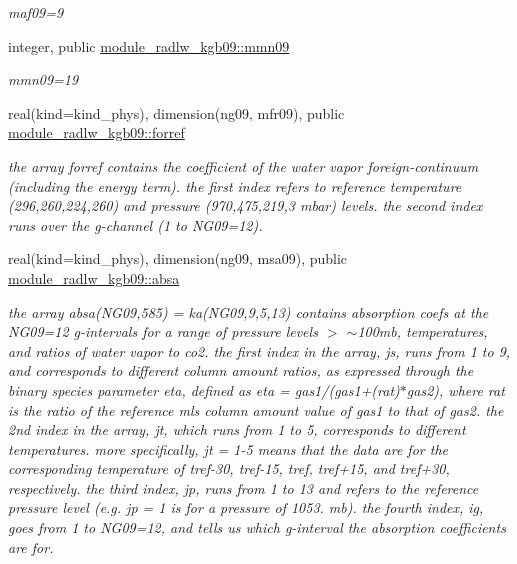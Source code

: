 \begin{Indent}
\begin{DoxyCompactItemize}
\begin{DoxyCompactList}\small\item\em maf09=9 \end{DoxyCompactList}\item 
integer, public \hyperlink{group__module__radlw__kgbnn_gaa9c8294b56ac3ce90b07114e986777a9}{module\+\_\+radlw\+\_\+kgb09\+::mmn09}
\begin{DoxyCompactList}\small\item\em mmn09=19 \end{DoxyCompactList}\item 
real(kind=kind\+\_\+phys), dimension(ng09, mfr09), public \hyperlink{group__module__radlw__kgbnn_ga72a8c0879636dba20e2a8a35ba79f681}{module\+\_\+radlw\+\_\+kgb09\+::forref}
\begin{DoxyCompactList}\small\item\em the array forref contains the coefficient of the water vapor foreign-\/continuum (including the energy term). the first index refers to reference temperature (296,260,224,260) and pressure (970,475,219,3 mbar) levels. the second index runs over the g-\/channel (1 to N\+G09=12). \end{DoxyCompactList}\item 
real(kind=kind\+\_\+phys), dimension(ng09, msa09), public \hyperlink{group__module__radlw__kgbnn_ga7a8726efe46fac4d6cce55ca357199ab}{module\+\_\+radlw\+\_\+kgb09\+::absa}
\begin{DoxyCompactList}\small\item\em the array absa(\+N\+G09,585) = ka(\+N\+G09,9,5,13) contains absorption coefs at the N\+G09=12 g-\/intervals for a range of pressure levels $>$ $\sim$100mb, temperatures, and ratios of water vapor to co2. the first index in the array, js, runs from 1 to 9, and corresponds to different column amount ratios, as expressed through the binary species parameter eta, defined as eta = gas1/(gas1+(rat)$\ast$gas2), where rat is the ratio of the reference mls column amount value of gas1 to that of gas2. the 2nd index in the array, jt, which runs from 1 to 5, corresponds to different temperatures. more specifically, jt = 1-\/5 means that the data are for the corresponding temperature of tref-\/30, tref-\/15, tref, tref+15, and tref+30, respectively. the third index, jp, runs from 1 to 13 and refers to the reference pressure level (e.\+g. jp = 1 is for a pressure of 1053. mb). the fourth index, ig, goes from 1 to N\+G09=12, and tells us which g-\/interval the absorption coefficients are for. \end{DoxyCompactList}\item 

\end{DoxyCompactItemize}
\end{Indent}
